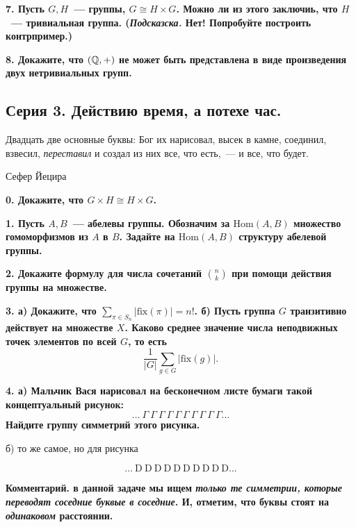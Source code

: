 \documentclass[12pt, oneside, dvipsnames]{extarticle}
\begin{document}
	 \bf{7.}  Пусть $G, H$~--- группы,  $G \cong H \times G$. Можно ли из этого заключиь, что $H$~--- тривиальная группа. (\emph{Подсказска.} Нет! Попробуйте построить контрпример.)

	 \bf{8.} Докажите, что $(\mathbb{Q}, +)$ не может быть представлена в виде произведения двух нетривиальных групп.

	 \begin{center}
	 	\subsection*{Серия 3. Действию время, а потехе час. }
	 \end{center}

	\epigraph{Двадцать две основные буквы: Бог их нарисовал, высек в камне, соединил, взвесил, \emph{переставил} и создал из них все, что есть,~--- и все, что будет.}{Сефер Йецира}

	\bf{0.} Докажите, что $G \times H \cong H \times G$.

	\bf{1.} Пусть $A, B$~--- абелевы группы. Обозначим за $\mathrm{Hom}(A, B)$ множество гомоморфизмов из $A$ в $B$. Задайте на $\mathrm{Hom}(A, B)$ структуру абелевой группы. 

	\bf{2.} Докажите формулу для числа сочетаний $\binom{n}{k}$ при помощи действия группы на множестве. 

	\bf{3.} а) Докажите, что $\sum_{\pi \in S_n} |\mathrm{fix}(\pi)| = n!$. б) Пусть группа $G$ транзитивно действует на множестве $X$. Каково среднее значение числа неподвижных точек элементов по всей $G$, то есть 
	\[
		\frac{1}{|G|}\sum_{g \in G} |\mathrm{fix}(g)|. 
	\]


	\bf{4.} а) Мальчик Вася нарисовал на бесконечном листе бумаги такой концептуальный рисунок: 
	\[
		\ldots \ \Gamma \ \Gamma \ \Gamma \ \Gamma \ \Gamma \ \Gamma \ \Gamma \ \Gamma \ \Gamma \ \Gamma \ldots
	\]
	Найдите группу симметрий этого рисунка. 

	б) то же самое, но для рисунка 

	\[
		\ldots \ \mathrm{D} \ \mathrm{D} \ \mathrm{D} \ \mathrm{D} \ \mathrm{D}\ \mathrm{D} \ \mathrm{D} \ \mathrm{D} \ \mathrm{D} \ \mathrm{D}\ldots
	\]

	\noindent\bf{Комментарий.} в данной задаче мы ищем \emph{только те симметрии, которые переводят соседние буквые в соседние}. И, отметим, что буквы стоят на \emph{одинаковом} расстоянии. 
\end{document}

